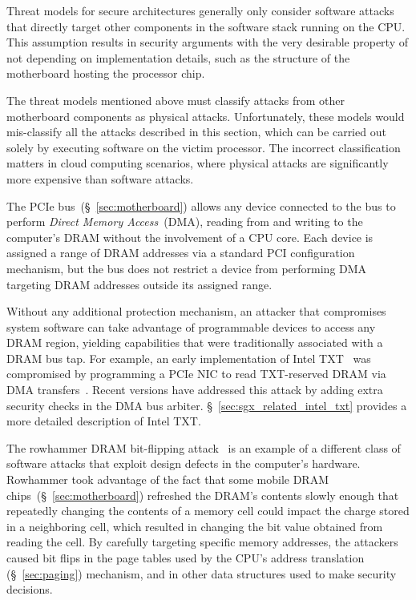 \label{sec:device_attacks}

Threat models for secure architectures generally only consider software attacks
that directly target other components in the software stack running on the CPU.
This assumption results in security arguments with the very desirable property
of not depending on implementation details, such as the structure of the
motherboard hosting the processor chip.

The threat models mentioned above must classify attacks from other motherboard
components as physical attacks. Unfortunately, these models would mis-classify
all the attacks described in this section, which can be carried out solely by
executing software on the victim processor. The incorrect classification
matters in cloud computing scenarios, where physical attacks are significantly
more expensive than software attacks.


\label{sec:pcie_attacks}

The PCIe bus~(\S~\ref{sec:motherboard}) allows any device connected to the bus
to perform \textit{Direct Memory Access}~(DMA), reading from and writing to
the computer's DRAM without the involvement of a CPU core. Each device is
assigned a range of DRAM addresses via a standard PCI configuration mechanism,
but the bus does not restrict a device from performing DMA targeting DRAM
addresses outside its assigned range.

Without any additional protection mechanism, an attacker that compromises system
software can take advantage of programmable devices to access any DRAM region,
yielding capabilities that were traditionally associated with a DRAM bus tap.
For example, an early implementation of Intel TXT~\cite{grawrock2009txt} was
compromised by programming a PCIe NIC to read TXT-reserved DRAM via DMA
transfers~\cite{wojtczuk2011txt}. Recent versions have addressed this attack by
adding extra security checks in the DMA bus arbiter.
\S~\ref{sec:sgx_related_intel_txt} provides a more detailed description of
Intel TXT.


\label{sec:rowhammer_attack}

The rowhammer DRAM bit-flipping attack~\cite{kim2014rowhammer,
google2015rowhammer, gruss2015rowhammer} is an example of a different class of
software attacks that exploit design defects in the computer's hardware.
Rowhammer took advantage of the fact that some mobile DRAM
chips~(\S~\ref{sec:motherboard}) refreshed the DRAM's contents slowly enough
that repeatedly changing the contents of a memory cell could impact the charge
stored in a neighboring cell, which resulted in changing the bit value obtained
from reading the cell. By carefully targeting specific memory addresses, the
attackers caused bit flips in the page tables used by the CPU's address
translation (\S~\ref{sec:paging}) mechanism, and in other data structures used
to make security decisions.

